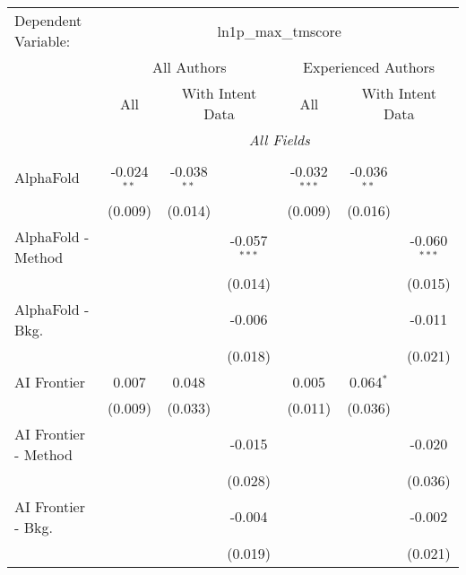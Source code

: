 \begingroup
\centering
\begin{tabular}{lcccccc}
   \tabularnewline \midrule \midrule
   Dependent Variable: & \multicolumn{6}{c}{ln1p\_max\_tmscore}\\
 & \multicolumn{3}{c}{All Authors} & \multicolumn{3}{c}{Experienced Authors} \\
\cmidrule(lr){2-4} \cmidrule(lr){5-7}
 & \multicolumn{1}{c}{All} & \multicolumn{2}{c}{With Intent Data} & \multicolumn{1}{c}{All} & \multicolumn{2}{c}{With Intent Data} \\
\cmidrule(lr){2-2} \cmidrule(lr){3-4} \cmidrule(lr){5-5} \cmidrule(lr){6-7}
 & \multicolumn{6}{c}{\textit{All Fields}} \\ \\
   AlphaFold            & -0.024$^{**}$ & -0.038$^{**}$ &                & -0.032$^{***}$ & -0.036$^{**}$ &   \\   
                        & (0.009)       & (0.014)       &                & (0.009)        & (0.016)       &   \\   
   AlphaFold - Method   &               &               & -0.057$^{***}$ &                &               & -0.060$^{***}$\\   
                        &               &               & (0.014)        &                &               & (0.015)\\   
   AlphaFold - Bkg.     &               &               & -0.006         &                &               & -0.011\\   
                        &               &               & (0.018)        &                &               & (0.021)\\   
   AI Frontier          & 0.007         & 0.048         &                & 0.005          & 0.064$^{*}$   &   \\   
                        & (0.009)       & (0.033)       &                & (0.011)        & (0.036)       &   \\   
   AI Frontier - Method &               &               & -0.015         &                &               & -0.020\\   
                        &               &               & (0.028)        &                &               & (0.036)\\   
   AI Frontier - Bkg.   &               &               & -0.004         &                &               & -0.002\\   
                        &               &               & (0.019)        &                &               & (0.021)\\   

\end{tabular}
